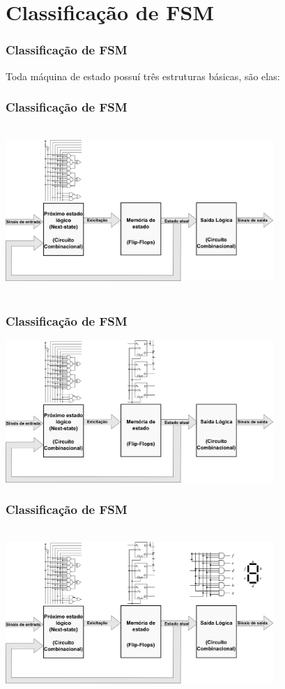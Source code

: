 \documentclass{beamer}
\begin{document}
\section{Classificação de FSM}
\begin{frame}
  \frametitle{Classificação de FSM}
   Toda máquina de estado possuí três estruturas básicas, são elas:
\end{frame}

\begin{frame}
  \frametitle{Classificação de FSM}
    \includegraphics[height = 2.5in, width = 4in]{modelo_4.png}
\end{frame}

\begin{frame}
  \frametitle{Classificação de FSM}
    \includegraphics[height = 2in.5, width = 4in]{modelo_5.png}
\end{frame}

\begin{frame}
  \frametitle{Classificação de FSM}
    \includegraphics[height = 2.5in, width = 4in]{modelo_6.png}
\end{frame}
\end{document}
